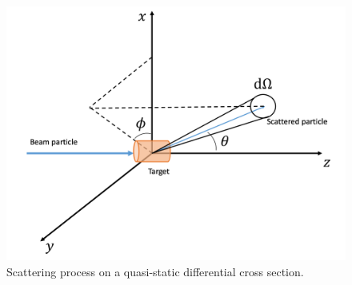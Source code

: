 \begin{figure}[h!]
	\centering
	\includegraphics[width=0.6\linewidth]{figures/diff_xsec.png}
	\caption{Scattering process on a quasi-static differential cross section.}
	\label{fig:diff_xsec}
\end{figure}

